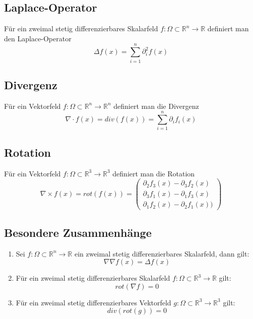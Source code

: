 \documentclass[a4paper,twocolumn,10pt]{article}
\begin{document}
\subsection{Laplace-Operator}
Für ein zweimal stetig differenzierbares Skalarfeld $f:\Omega\subset\mathbb{R}^n\rightarrow\mathbb{R}$ definiert man den Laplace-Operator
\begin{equation*}
\Delta f(x)=\sum\limits_{i=1}^{n}\partial_i^2 f(x)
\end{equation*}

\subsection{Divergenz}
Für ein Vektorfeld $f:\Omega\subset\mathbb{R}^n\rightarrow\mathbb{R}^n$ definiert man die Divergenz
\begin{equation*}
\nabla\cdot f(x)=div(f(x))=\sum\limits_{i=1}^{n}\partial_i f_i(x)
\end{equation*}

\subsection{Rotation}
Für ein Vektorfeld $f:\Omega\subset\mathbb{R}^3\rightarrow\mathbb{R}^3$ definiert man die Rotation
\begin{equation*}
\nabla\times f(x)=rot(f(x))=\begin{pmatrix}\partial_2 f_3(x)-\partial_3 f_2(x) \\ \partial_3 f_1(x)-\partial_1 f_3(x) \\ \partial_1 f_2(x)- \partial_2 f_1(x))\end{pmatrix}
\end{equation*}

\subsection{Besondere Zusammenhänge}
\begin{enumerate}[label=$\bullet$]
\item Sei $f:\Omega\subset\mathbb{R}^n\rightarrow\mathbb{R}$ ein zweimal stetig differenzierbares Skalarfeld, dann gilt:
\begin{equation*}
\nabla\nabla f(x)=\Delta f(x)
\end{equation*}
\item Für ein zweimal stetig differenzierbares Skalarfeld $f:\Omega\subset\mathbb{R}^3\rightarrow\mathbb{R}$ gilt:
\begin{equation*}
rot(\nabla f)=0
\end{equation*}
\item Für ein zweimal stetig differenzierbares Vektorfeld $g:\Omega\subset\mathbb{R}^3\rightarrow\mathbb{R}^3$ gilt:
\begin{equation*}
div(rot(g))=0
\end{equation*}
\end{enumerate}
\end{document}

